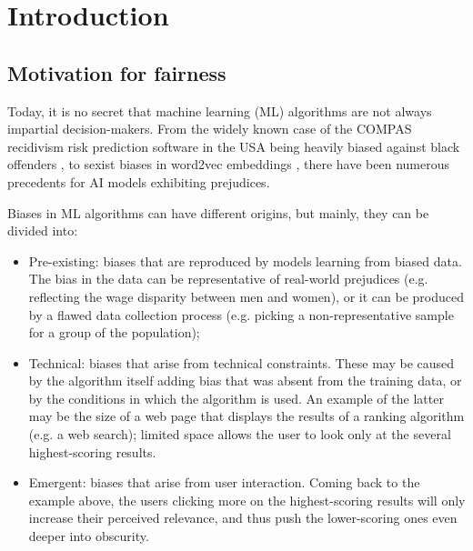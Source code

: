 \chapter{Introduction}
\label{introduction}


\section{Motivation for fairness}\label{sect:int_1}

Today, it is no secret that machine learning (ML) algorithms are not always impartial decision-makers. From the widely known case of the COMPAS recidivism risk prediction software in the USA being heavily biased against black offenders \cite{propublicacompas}, to sexist biases in word2vec embeddings \cite{1607.06520}, there have been numerous precedents for AI models exhibiting prejudices.

Biases in ML algorithms can have different origins, but mainly, they can be divided into:
\begin{itemize}
\item Pre-existing: biases that are reproduced by models learning from biased data. The bias in the data can be representative of real-world prejudices (e.g. reflecting the wage disparity between men and women), or it can be produced by a flawed data collection process (e.g. picking a non-representative sample for a group of the population);
\item Technical: biases that arise from technical constraints. These may be caused by the algorithm itself adding bias that was absent from the training data, or by the conditions in which the algorithm is used. An example of the latter may be the size of a web page that displays the results of a ranking algorithm (e.g. a web search); limited space allows the user to look only at the several highest-scoring results.
\item Emergent: biases that arise from user interaction. Coming back to the example above, the users clicking more on the highest-scoring results will only increase their perceived relevance, and thus push the lower-scoring ones even deeper into obscurity.
\end{itemize}

